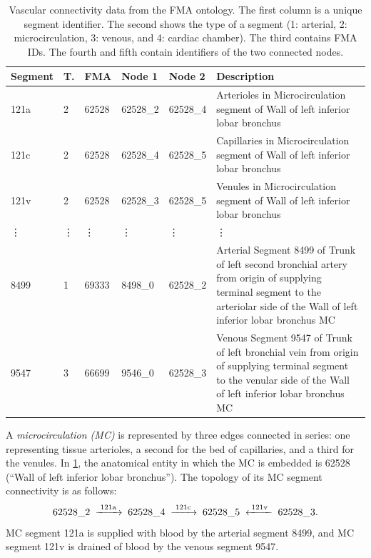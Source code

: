 \begin{table}
	\def\vdt{\hskip1pt\vdots}
	\begin{tabular}{l@{\ }l@{\ }l@{\ }l@{\ }l@{\ }|@{\ }p{6.2cm}}
	  \textbf{Segment} & \textbf{T.} & \textbf{FMA} & \textbf{Node 1} & \textbf{Node 2} & \textbf{Description} \\
	  \hline
	  121a & 2    & 62528  & 62528\_2 & 62528\_4  & Arterioles in Microcirculation segment of Wall of left inferior lobar bronchus \\[.5mm]
	  121c & 2    & 62528  & 62528\_4 & 62528\_5  & Capillaries in Microcirculation segment of Wall of left inferior lobar bronchus\\[.5mm]
	  121v & 2    & 62528  & 62528\_3 & 62528\_5  & Venules in Microcirculation segment of Wall of left inferior lobar bronchus\\
	  \vdt & \vdt & \vdt   & \vdt     & \vdt      & \vdt  \\[.5mm]
	  8499 & 1    & 69333  & 8498\_0  & 62528\_2  & Arterial Segment 8499 of Trunk
	of left second bronchial artery from origin of supplying terminal segment
	to the arteriolar side of the Wall of left inferior lobar bronchus MC\\[.5mm]
	  9547 & 3 & 66699 & 9546\_0 & 62528\_3 & Venous Segment 9547 of Trunk of
	left bronchial vein from origin of supplying terminal segment to the
	venular side of the Wall of left inferior lobar bronchus MC
	\end{tabular}\vskip2mm
	\caption{Vascular connectivity data from the FMA ontology. The first column
	         is a unique segment identifier. The second shows the
	         type of a segment (1: arterial, 2: microcirculation, 3: venous,
	         and 4: cardiac chamber). The third contains FMA IDs. The fourth and
	         fifth contain identifiers of the two connected nodes.}
	\label{tab:vascular-connectivity}
\end{table}

A \emph{microcirculation (MC)} is represented by three edges connected in series: one representing
tissue arterioles, a second for the bed of capillaries, and a third for the venules. In
\cref{tab:vascular-connectivity}, the anatomical entity in which the MC is embedded is 62528
(``Wall of left inferior lobar bronchus''). The topology of its MC segment connectivity is as
follows:
\[
	62528\_2  \;\xrightarrow{\;\text{121a}\;}\;
	62528\_4  \;\xrightarrow{\;\text{121c}\;}\;
	62528\_5  \;\xleftarrow {\;\text{121v}\;}\;
	62528\_3  \text.
\]
MC segment 121a is supplied with blood by the arterial segment 8499, and MC segment 121v is drained
of blood by the venous segment 9547.

